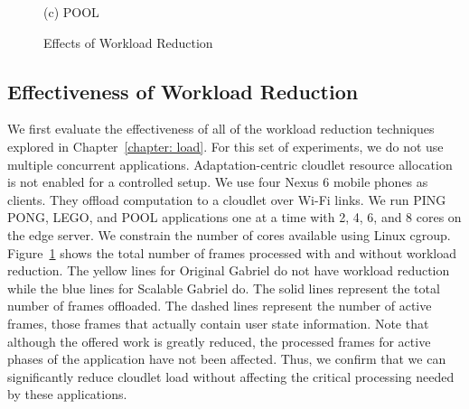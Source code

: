 \begin{figure}
\begin{minipage}[b]{0.3\linewidth}
    {(c) POOL}
  \end{minipage}
  \caption{Effects of Workload Reduction}
  \label{figs:workload-reduction}
\end{figure}


\subsection{Effectiveness of Workload Reduction}

We first evaluate the effectiveness of all of the workload reduction techniques
explored in Chapter~\ref{chapter: load}. For this set of experiments, we do not
use multiple concurrent applications. Adaptation-centric cloudlet resource
allocation is not enabled for a controlled setup. We use four Nexus 6 mobile
phones as clients. They offload computation to a cloudlet over Wi-Fi links. We
run PING PONG, LEGO, and POOL applications one at a time with 2, 4, 6, and 8
cores on the edge server. We constrain the number of cores available using Linux
cgroup. Figure~\ref{figs:workload-reduction} shows the total number of frames
processed with and without workload reduction. The yellow lines for Original
Gabriel do not have workload reduction while the blue lines for Scalable Gabriel
do. The solid lines represent the total number of frames offloaded. The dashed
lines represent the number of active frames, those frames that actually contain
user state information. Note that although the offered work is greatly reduced,
the processed frames for active phases of the application have not been
affected. Thus, we confirm that we can significantly reduce cloudlet load
without affecting the critical processing needed by these applications.

